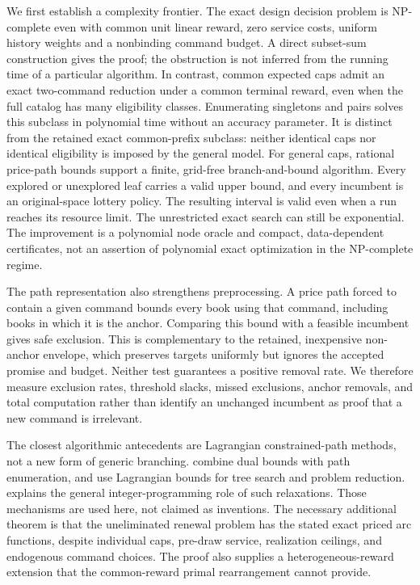 We first establish a complexity frontier. The exact design decision problem is NP-complete even with common unit linear reward, zero service costs, uniform history weights and a nonbinding command budget. A direct subset-sum construction gives the proof; the obstruction is not inferred from the running time of a particular algorithm. In contrast, common expected caps admit an exact two-command reduction under a common terminal reward, even when the full catalog has many eligibility classes. Enumerating singletons and pairs solves this subclass in polynomial time without an accuracy parameter. It is distinct from the retained exact common-prefix subclass: neither identical caps nor identical eligibility is imposed by the general model. For general caps, rational price-path bounds support a finite, grid-free branch-and-bound algorithm. Every explored or unexplored leaf carries a valid upper bound, and every incumbent is an original-space lottery policy. The resulting interval is valid even when a run reaches its resource limit. The unrestricted exact search can still be exponential. The improvement is a polynomial node oracle and compact, data-dependent certificates, not an assertion of polynomial exact optimization in the NP-complete regime.

The path representation also strengthens preprocessing. A price path forced to contain a given command bounds every book using that command, including books in which it is the anchor. Comparing this bound with a feasible incumbent gives safe exclusion. This is complementary to the retained, inexpensive non-anchor envelope, which preserves targets uniformly but ignores the accepted promise and budget. Neither test guarantees a positive removal rate. We therefore measure exclusion rates, threshold slacks, missed exclusions, anchor removals, and total computation rather than identify an unchanged incumbent as proof that a new command is irrelevant.

The closest algorithmic antecedents are Lagrangian constrained-path methods, not a new form of generic branching. \citet{HandlerZang1980} combine dual bounds with path enumeration, and \citet{BeasleyChristofides1989} use Lagrangian bounds for tree search and problem reduction. \citet{Fisher1981} explains the general integer-programming role of such relaxations. Those mechanisms are used here, not claimed as inventions. The necessary additional theorem is that the uneliminated renewal problem has the stated exact priced arc functions, despite individual caps, pre-draw service, realization ceilings, and endogenous command choices. The proof also supplies a heterogeneous-reward extension that the common-reward primal rearrangement cannot provide.

